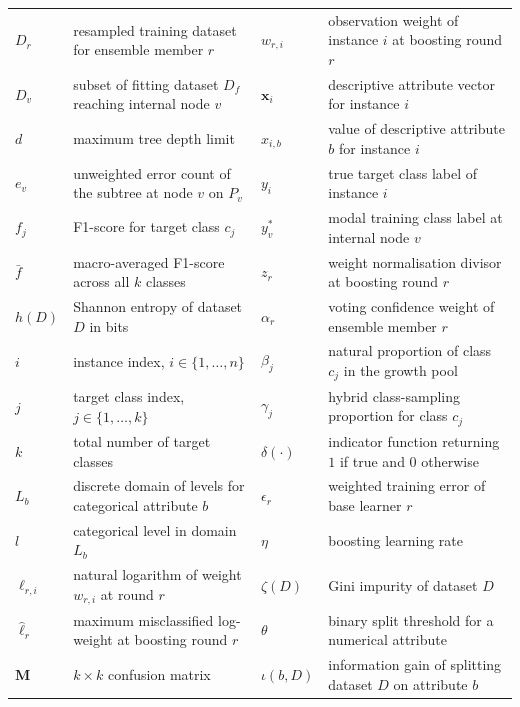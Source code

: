 \begin{table}[!ht]
\begin{tabular}{lp{6.8cm}lp{6.8cm}}
$D_r$             & resampled training dataset for ensemble member $r$ & $w_{r,i}$       & observation weight of instance $i$ at boosting round $r$ \\
$D_v$             & subset of fitting dataset $D_f$ reaching internal node $v$ & $\mathbf{x}_i$  & descriptive attribute vector for instance $i$ \\
$d$               & maximum tree depth limit & $x_{i,b}$       & value of descriptive attribute $b$ for instance $i$ \\
$e_v$             & unweighted error count of the subtree at node $v$ on $P_v$ & $y_i$           & true target class label of instance $i$ \\
$f_j$             & F1-score for target class $c_j$ & $y^*_v$         & modal training class label at internal node $v$ \\
$\bar{f}$         & macro-averaged F1-score across all $k$ classes & $z_r$           & weight normalisation divisor at boosting round $r$ \\
$h(D)$            & Shannon entropy of dataset $D$ in bits & $\alpha_r$      & voting confidence weight of ensemble member $r$ \\
$i$               & instance index, $i \in \{1, \dots, n\}$ & $\beta_j$       & natural proportion of class $c_j$ in the growth pool \\
$j$               & target class index, $j \in \{1, \dots, k\}$ & $\gamma_j$      & hybrid class-sampling proportion for class $c_j$ \\
$k$               & total number of target classes & $\delta(\cdot)$ & indicator function returning $1$ if true and $0$ otherwise \\
$L_b$             & discrete domain of levels for categorical attribute $b$ & $\epsilon_r$    & weighted training error of base learner $r$ \\
$l$               & categorical level in domain $L_b$ & $\eta$          & boosting learning rate \\
$\ell_{r,i}$      & natural logarithm of weight $w_{r,i}$ at round $r$ & $\zeta(D)$      & Gini impurity of dataset $D$ \\
$\hat{\ell}_r$    & maximum misclassified log-weight at boosting round $r$ & $\theta$        & binary split threshold for a numerical attribute \\
$\mathbf{M}$      & $k \times k$ confusion matrix & $\iota(b, D)$   & information gain of splitting dataset $D$ on attribute $b$ \\

\end{tabular}
\end{table}

